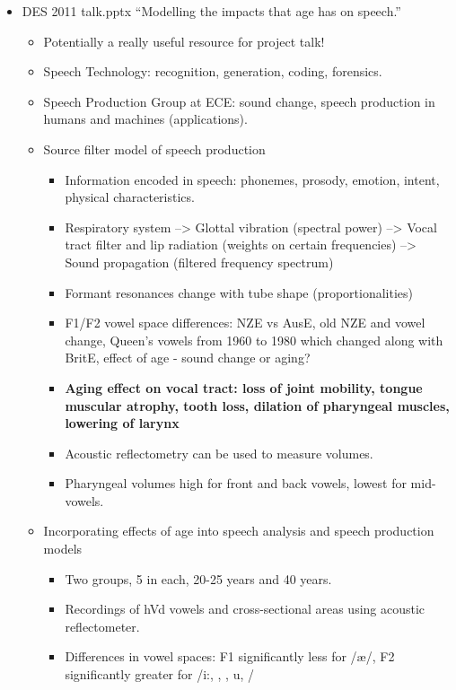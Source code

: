 \documentclass{article}
\begin{document}
\begin{itemize}
\begin{itemize}
        \item DES 2011 talk.pptx ``Modelling the impacts that age has on speech.''
        \begin{itemize}
            \item Potentially a really useful resource for project talk!
            \item Speech Technology: recognition, generation, coding, forensics.
            \item Speech Production Group at ECE: sound change, speech production in humans and machines (applications).
            \item Source filter model of speech production
            \begin{itemize}
                \item Information encoded in speech: phonemes, prosody, emotion, intent, physical characteristics.
                \item Respiratory system --> Glottal vibration (spectral power) --> Vocal tract filter and lip radiation (weights on certain frequencies) --> Sound propagation (filtered frequency spectrum)
                \item Formant resonances change with tube shape (proportionalities)
                \item F1/F2 vowel space differences: NZE vs AusE, old NZE and vowel change, Queen's vowels from 1960 to 1980 which changed along with BritE, effect of age - sound change or aging?
                \item \textbf{Aging effect on vocal tract: loss of joint mobility, tongue muscular atrophy, tooth loss, dilation of pharyngeal muscles, lowering of larynx}
                \item Acoustic reflectometry can be used to measure volumes.
                \item Pharyngeal volumes high for front and back vowels, lowest for mid-vowels.
            \end{itemize}
            \item Incorporating effects of age into speech analysis and speech production models
            \begin{itemize}
                \item Two groups, 5 in each, 20-25 years and 40 years.
                \item Recordings of hVd vowels and cross-sectional areas using acoustic reflectometer.
                \item Differences in vowel spaces: F1 significantly less for /\ae/, F2 significantly greater for /i:, , \textipa{\ae}, u, /

\end{itemize}
\end{itemize}
\end{itemize}
\end{itemize}
\end{document}
